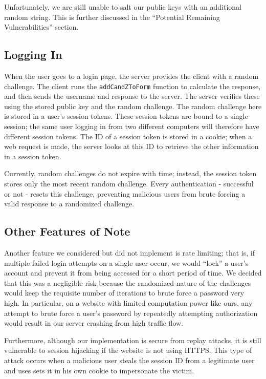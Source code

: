 \documentclass[11pt]{article}
\begin{document}
Unfortunately, we are still unable to salt our public keys with an additional random string. This is further discussed in the ``Potential Remaining Vulnerabilities'' section.

\subsection{Logging In}

When the user goes to a login page, the server provides the client with a random challenge. The client runs the \texttt{addCandZToForm} function to calculate the response, and then sends the username and response to the server. The server verifies these using the stored public key and the random challenge.
The random challenge here is stored in a user's session tokens. These session tokens are bound to a single session; the same user logging in from two different computers will therefore have different session tokens. The ID of a session token is stored in a cookie; when a web request is made, the server looks at this ID to retrieve the other information in a session token.

Currently, random challenges do not expire with time; instead, the session token stores only the most recent random challenge. Every authentication - successful or not - resets this challenge, preventing malicious users from brute forcing a valid response to a randomized challenge.

\subsection{Other Features of Note}

Another feature we considered but did not implement is rate limiting; that is, if multiple failed login attempts on a single user occur, we would ``lock'' a user's account and prevent it from being accessed for a short period of time. We decided that this was a negligible risk because the randomized nature of the challenges would keep the requisite number of iterations to brute force a password very high. In particular, on a website with limited computation power like ours, any attempt to brute force a user's password by repeatedly attempting authorization would result in our server crashing from high traffic flow.

Furthermore, although our implementation is secure from replay attacks, it is still vulnerable to session hijacking if the website is not using HTTPS. This type of attack occurs when a malicious user steals the session ID from a legitimate user and uses sets it in his own cookie to impersonate the victim.
\end{document}
